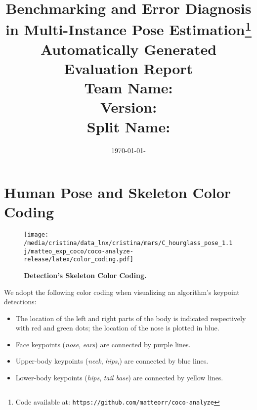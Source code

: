 \documentclass[10pt,onecolumn,letterpaper]{article}
\begin{document}
\title{Benchmarking and Error Diagnosis in Multi-Instance Pose Estimation\footnote{Code available at: \texttt{https://github.com/matteorr/coco-analyze}}\\
Automatically Generated Evaluation Report\\[1.5ex]
\textbf{Team Name:}  \texttt{}\\[1.5ex]
\textbf{Version:}    \texttt{}\\[1.5ex]
\textbf{Split Name:} \texttt{}}
\date{\today - \currenttime}
\maketitle


\section{Human Pose and Skeleton Color Coding}
\begin{wrapfigure}{l}{0.5\textwidth}
\texttt{[image: /media/cristina/data\_lnx/cristina/mars/C\_hourglass\_pose\_1.1j/matteo\_exp\_coco/coco-analyze-release/latex/color\_coding.pdf]}
\caption{ {\small \textbf{Detection's Skeleton Color Coding.}}}
\end{wrapfigure}
We adopt the following color coding when visualizing an algorithm's keypoint detections:
\begin{itemize}
    \item The location of the left and right parts of the body is indicated respectively with red and green dots; the location of the nose is plotted in blue.%
    \item Face keypoints (\textit{nose}, \textit{ears}) are connected by purple lines.
    \item Upper-body keypoints (\textit{neck}, \textit{hips},) are connected by blue lines.
    \item Lower-body keypoints (\textit{hips}, \textit{tail base}) are connected by yellow lines.
\end{itemize}
\clearpage

\end{document}
